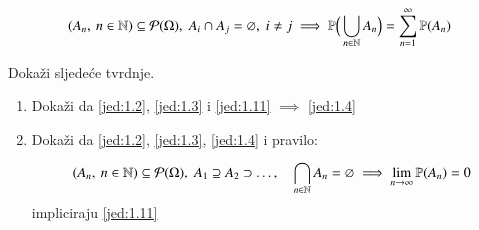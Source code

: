 \begin{equation} \label{jed:1.11}
    (A_n, \: n \in \mathbb{N}) \subseteq \mathcal{P}({\Omega}), \; A_i \cap A_j = \varnothing, \; i \neq j \implies \mathbb{P} \Big(\bigcup\limits_{n \in \mathbb{N}}^{} A_n \Big) = \sum\limits_{n = 1}^{\infty} \mathbb{P}({A_n})
\end{equation}

\begin{zad} \label{zad:1.12}
    Doka\v zi sljede\' ce tvrdnje.
    \begin{enumerate}[label=(\alph*)]
        \item Doka\v zi da \eqref{jed:1.2}, \eqref{jed:1.3} i \eqref{jed:1.11} $\implies$ \eqref{jed:1.4}
        \item Doka\v zi da \eqref{jed:1.2}, \eqref{jed:1.3}, \eqref{jed:1.4} i pravilo:
        \begin{equation} \label{jed:1.13}
            (A_n, \: n \in \mathbb{N}) \subseteq \mathcal{P}({\Omega}), \; A_1 \supseteq A_2 \supset \dots, \quad \bigcap\limits_{n \in \mathbb{N}}^{} A_n = \varnothing \implies \lim_{n \to \infty} \mathbb{P}({A_n}) = 0
        \end{equation}
        impliciraju \eqref{jed:1.11}
    \end{enumerate}
\end{zad}


